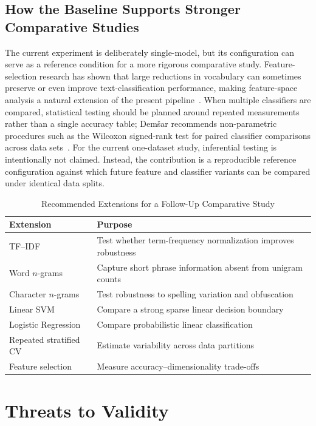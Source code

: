 \documentclass[conference]{IEEEtran}
\begin{document}
\subsection{How the Baseline Supports Stronger Comparative Studies}
The current experiment is deliberately single-model, but its configuration can serve as a reference condition for a more rigorous comparative study. Feature-selection research has shown that large reductions in vocabulary can sometimes preserve or even improve text-classification performance, making feature-space analysis a natural extension of the present pipeline~\cite{yang1997feature}. When multiple classifiers are compared, statistical testing should be planned around repeated measurements rather than a single accuracy table; Dem\v{s}ar recommends non-parametric procedures such as the Wilcoxon signed-rank test for paired classifier comparisons across data sets~\cite{demsar2006}. For the current one-dataset study, inferential testing is intentionally not claimed. Instead, the contribution is a reproducible reference configuration against which future feature and classifier variants can be compared under identical data splits.

\begin{table}[t]
\caption{Recommended Extensions for a Follow-Up Comparative Study}
\label{tab:futurecompare}
\centering
\scriptsize
\begin{tabular}{p{2.2cm}p{3.9cm}}
\toprule
Extension & Purpose \\
\midrule
TF--IDF & Test whether term-frequency normalization improves robustness \\
Word $n$-grams & Capture short phrase information absent from unigram counts \\
Character $n$-grams & Test robustness to spelling variation and obfuscation \\
Linear SVM & Compare a strong sparse linear decision boundary \\
Logistic Regression & Compare probabilistic linear classification \\
Repeated stratified CV & Estimate variability across data partitions \\
Feature selection & Measure accuracy--dimensionality trade-offs \\
\bottomrule
\end{tabular}
\end{table}

\section{Threats to Validity}
\end{document}
